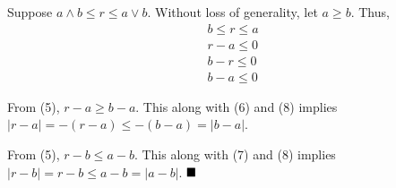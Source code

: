 \documentclass{book}
\begin{document}
Suppose $a \land b \leq r \leq a \lor b$. Without loss of generality, let $a \geq b$. Thus, 
\begin{align}
    b \leq r \leq a
\\  r - a \leq 0
\\  b - r \leq 0
\\  b - a \leq 0
\end{align}

From (5), $r - a \geq b - a$. This along with (6) and (8) implies $|r - a| = -(r - a) \leq -(b - a) = |b - a|$.

From (5), $r - b \leq a - b$. This along with (7) and (8) implies $|r - b| = r - b \leq a - b = |a - b|$.
$\hfill \blacksquare$ \\ \\






\end{document}
